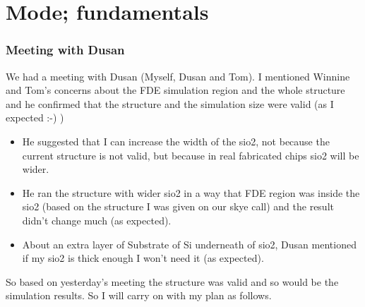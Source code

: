 \documentclass{beamer}
\begin{document}
\section{Mode; fundamentals} 
\begin{frame}
\frametitle{Meeting with Dusan}
 We had a meeting with Dusan (Myself, Dusan and Tom). I mentioned  Winnine and Tom's concerns about the FDE simulation region and the whole structure  and he  confirmed that the structure and the simulation size were valid (as I expected :-) )
\begin{itemize}
\item He suggested that I can increase the width of the sio2, not because the current structure is not valid, but because in real fabricated chips sio2 will be wider. 
\item He ran the structure with wider sio2 in a way that FDE region was inside the sio2 (based on the structure I was given on our skye call) and the result didn't change much (as expected).
\item About an extra layer of Substrate of Si underneath of sio2, Dusan mentioned if my sio2 is thick enough I won't need it (as expected).
\end{itemize}
So based on yesterday's meeting the structure was valid and so would be the simulation results. So I will carry on with my plan as follows.
\end{frame}
\end{document}
